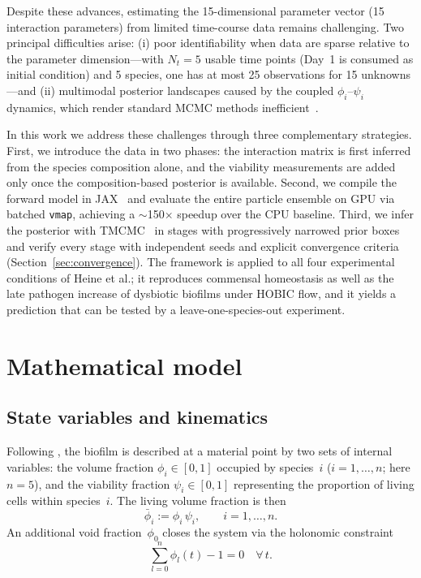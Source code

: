\documentclass[pdflatex,sn-mathphys-ay,lineno]{sn-jnl}%
\begin{document}
Despite these advances, estimating the 15-dimensional parameter vector (15 interaction parameters) from limited time-course data remains challenging.
Two principal difficulties arise: (i) poor identifiability when data are sparse relative to the parameter dimension---with $N_t=5$ usable time points (Day~1 is consumed as initial condition) and 5 species, one has at most 25 observations for 15 unknowns---and (ii) multimodal posterior landscapes caused by the coupled $\phi_i$--$\psi_i$ dynamics, which render standard MCMC methods inefficient~\citep{RobertCasella2004MonteCarlo}.

In this work we address these challenges through three complementary strategies.
First, we introduce the data in two phases: the interaction matrix is first inferred from the species composition alone, and the viability measurements are added only once the composition-based posterior is available.
Second, we compile the forward model in JAX~\citep{jax2018github} and evaluate the entire particle ensemble on GPU via batched \texttt{vmap}, achieving a $\sim$150$\times$ speedup over the CPU baseline.
Third, we infer the posterior with TMCMC~\citep{ChingChen2007TMCMC, Betz2016TMCMC} in stages with progressively narrowed prior boxes and verify every stage with independent seeds and explicit convergence criteria (Section~\ref{sec:convergence}).
The framework is applied to all four experimental conditions of Heine et al.; it reproduces commensal homeostasis as well as the late pathogen increase of dysbiotic biofilms under HOBIC flow, and it yields a prediction that can be tested by a leave-one-species-out experiment.

\section{Mathematical model}
\label{sec:model}

\subsection{State variables and kinematics}

Following \citet{Klempt2025ContinuumBiofilm, Klempt2024ContinuumGrowth}, the biofilm is described at a material point by two sets of internal variables: the volume fraction $\phi_i \in [0,1]$ occupied by species~$i$ ($i=1,\dots,n$; here $n=5$), and the viability fraction $\psi_i \in [0,1]$ representing the proportion of living cells within species~$i$.
The living volume fraction is then
\begin{equation}
\bar{\phi}_i := \phi_i\,\psi_i,
\qquad i=1,\dots,n.
\label{eq:living}
\end{equation}
An additional void fraction~$\phi_0$ closes the system via the holonomic constraint
\begin{equation}
\sum_{l=0}^{n}\phi_l(t) - 1 = 0 \quad\forall\,t.
\label{eq:constraint}
\end{equation}
\end{document}
